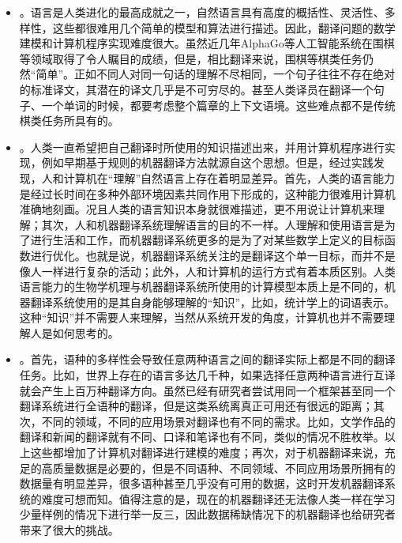 \begin{itemize}
\vspace{0.5em}
\item {\small{}}。语言是人类进化的最高成就之一，自然语言具有高度的概括性、灵活性、多样性，这些都很难用几个简单的模型和算法进行描述。因此，翻译问题的数学建模和计算机程序实现难度很大。虽然近几年AlphaGo等人工智能系统在围棋等领域取得了令人瞩目的成绩，但是，相比翻译来说，围棋等棋类任务仍然“简单”。正如不同人对同一句话的理解不尽相同，一个句子往往不存在绝对的标准译文，其潜在的译文几乎是不可穷尽的。甚至人类译员在翻译一个句子、一个单词的时候，都要考虑整个篇章的上下文语境。这些难点都不是传统棋类任务所具有的。
\vspace{0.5em}
\item {\small{}}。人类一直希望把自己翻译时所使用的知识描述出来，并用计算机程序进行实现，例如早期基于规则的机器翻译方法就源自这个思想。但是，经过实践发现，人和计算机在“理解”自然语言上存在着明显差异。首先，人类的语言能力是经过长时间在多种外部环境因素共同作用下形成的，这种能力很难用计算机准确地刻画。况且人类的语言知识本身就很难描述，更不用说让计算机来理解；其次，人和机器翻译系统理解语言的目的不一样。人理解和使用语言是为了进行生活和工作，而机器翻译系统更多的是为了对某些数学上定义的目标函数进行优化。也就是说，机器翻译系统关注的是翻译这个单一目标，而并不是像人一样进行复杂的活动；此外，人和计算机的运行方式有着本质区别。人类语言能力的生物学机理与机器翻译系统所使用的计算模型本质上是不同的，机器翻译系统使用的是其自身能够理解的“知识”，比如，统计学上的词语表示。这种“知识”并不需要人来理解，当然从系统开发的角度，计算机也并不需要理解人是如何思考的。
\vspace{0.5em}
\item {\small{}}。首先，语种的多样性会导致任意两种语言之间的翻译实际上都是不同的翻译任务。比如，世界上存在的语言多达几千种，如果选择任意两种语言进行互译就会产生上百万种翻译方向。虽然已经有研究者尝试用同一个框架甚至同一个翻译系统进行全语种的翻译，但是这类系统离真正可用还有很远的距离；其次，不同的领域，不同的应用场景对翻译也有不同的需求。比如，文学作品的翻译和新闻的翻译就有不同、口译和笔译也有不同，类似的情况不胜枚举。以上这些都增加了计算机对翻译进行建模的难度；再次，对于机器翻译来说，充足的高质量数据是必要的，但是不同语种、不同领域、不同应用场景所拥有的数据量有明显差异，很多语种甚至几乎没有可用的数据，这时开发机器翻译系统的难度可想而知。值得注意的是，现在的机器翻译还无法像人类一样在学习少量样例的情况下进行举一反三，因此数据稀缺情况下的机器翻译也给研究者带来了很大的挑战。
\vspace{0.5em}
\end{itemize}

